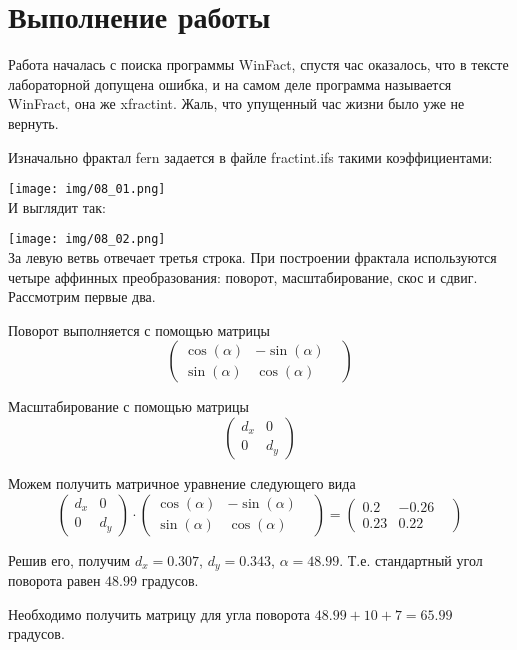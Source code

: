 \section{Выполнение работы}

Работа началась с поиска программы WinFact, спустя час оказалось, что в тексте лабораторной допущена ошибка, и на самом деле программа называется WinFract, она же xfractint. Жаль, что упущенный час жизни было уже не вернуть.

Изначально фрактал fern задается в файле fractint.ifs такими коэффициентами:

\texttt{[image: img/08\_01.png]}\\

И выглядит так:

\texttt{[image: img/08\_02.png]}\\

За левую ветвь отвечает третья строка. При построении фрактала используются четыре аффинных преобразования: поворот, масштабирование, скос и сдвиг. Рассмотрим первые два.

Поворот выполняется с помощью матрицы
$$
\begin{pmatrix}
\cos(\alpha)& -\sin(\alpha)\\
\sin(\alpha)& \cos(\alpha)& 
\end{pmatrix}
$$

Масштабирование с помощью матрицы
$$
\begin{pmatrix}
d_{x}& 0\\
0& d_{y}
\end{pmatrix}
$$

Можем получить матричное уравнение следующего вида
$$
\begin{pmatrix}
d_{x}& 0\\
0& d_{y}
\end{pmatrix}
\cdot
\begin{pmatrix}
\cos(\alpha)& -\sin(\alpha)\\
\sin(\alpha)& \cos(\alpha)& 
\end{pmatrix}
=
\begin{pmatrix}
0.2& -0.26\\
0.23& 0.22& 
\end{pmatrix}
$$

Решив его, получим $d_{x} = 0.307$, $d_{y} = 0.343$, $\alpha = 48.99$. Т.е. стандартный угол поворота равен $48.99$ градусов.

Необходимо получить матрицу для угла поворота $48.99 + 10 + 7 = 65.99$ градусов.

